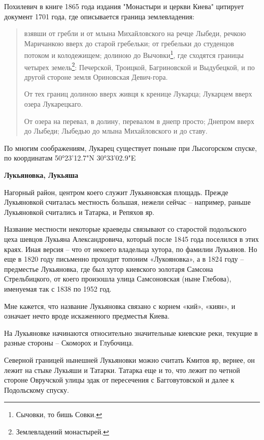 Похилевич в книге 1865 года издания "Монастыри и церкви Киева" цитирует документ 1701 года, где описывается граница землевладения:

\begin{quotation}
взявши от гребли и от млына Михайловского на речце Лыбеди, речкою Маричанкою вверх до старой гребельки; от гребельки до студенцов потоком и колодежищем; долиною до Вычовки\footnote{Сычовки, то бишь Совки.}, где сходятся границы четырех земель\footnote{Землевладений монастырей.}: Печерской, Троицкой, Багриновской и Выдубецкой, и по другой стороне земля Ориновская Девич-гора. 

От тех границ долиною вверх живця к кренице Лукарца; Лукарцем вверх озера Лукарецкаго.

От озера на перевал, в долину, перевалом в днепр просто; Днепром вверх до Лыбеди; Лыбедью до млына Михайловского и до ставу.
\end{quotation}

По многим соображениям, Лукарец существует поныне при Лысогорском спуске, по координатам 50°23'12.7"N 30°33'02.9"E\\

\newpage


\textbf{Лукьяновка, Лукьяша}

Нагорный район, центром коего служит Лукьяновская площадь. Прежде Лукьяновкой считалась местность большая, нежели сейчас – например, раньше Лукьяновкой считались и Татарка, и Репяхов яр. 

Название местности некоторые краеведы связывают со старостой подольского цеха шевцов Лукьяна Александровича, который после 1845 года поселился в этих краях. Иная версия – что от некоего владельца хутора, по фамилии Лукьянов. Но еще в 1820 году письменно проходит топоним «Лукояновка», а в 1824 году – предместье Лукьяновка, где был хутор киевского золотаря Самсона Стрельбицкого, от коего произошла улица Самсоновская (ныне Глебова), именуемая так с 1838 по 1952 год.

Мне кажется, что название Лукьяновка связано с корнем «кий», «киян», и означает нечто вроде искаженного предместья Киева.

На Лукьяновке начинаются относительно значительные киевские реки, текущие в разные стороны – Скоморох и Глубочица.

Северной границей нынешней Лукьяновки можно считать Кмитов яр, вернее, он лежит на стыке Лукьяши и Татарки. Татарка еще и то, что лежит по четной стороне Овручской улицы эдак от пересечения с Багговутовской и далее к Подольскому спуску.\\

